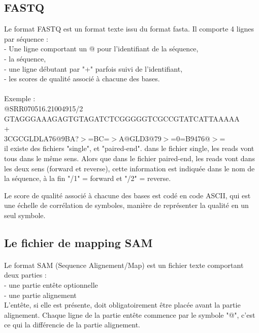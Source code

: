 \documentclass[a4paper,12pt]{article}
\begin{document}
\subsection{FASTQ}

Le format FASTQ est un format texte issu du format fasta. Il comporte 4 lignes par séquence : \\
- Une ligne comportant un @ pour l'identifiant de la séquence, \\
   - la séquence,  \\
   - une ligne débutant par "+" parfois suivi de l’identifiant, \\
   - les scores de qualité associé à chacune des bases. \\\\
Exemple : \\
@SRR070516.21004915/2 \\
GTAGGGAAAGAGTGTAGATCTCGGGGGTCGCCGTATCATTAAAAA \\
+ \\
3CGCGLDLA76@9BA?$>$=BC=$>$A@GLD3@79$>$=0=B9476@$>$= \\

il existe des fichiers "single", et "paired-end". dans le fichier single, les reads vont tous dans le même sens. Alors que dans le fichier paired-end, les reads vont dans les deux sens (forward et reverse), cette information est indiquée dans le nom de la séquence, à la fin "/1" = forward et "/2" = reverse.

Le score de qualité associé à chacune des bases est codé en code ASCII, qui est une échelle de corrélation de symboles, manière de représenter la qualité en un seul symbole.
\\

\subsection{Le fichier de mapping SAM}
\paragraph{}
Le format SAM (Sequence Alignement/Map) est un fichier texte comportant deux parties : \\
- une partie entête optionnelle \\
- une partie alignement\\
L'entête, si elle est présente, doit obligatoirement être placée avant la partie alignement. Chaque ligne de la partie entête commence par le symbole "@", c'est ce qui la différencie de la partie alignement. 
\end{document}
